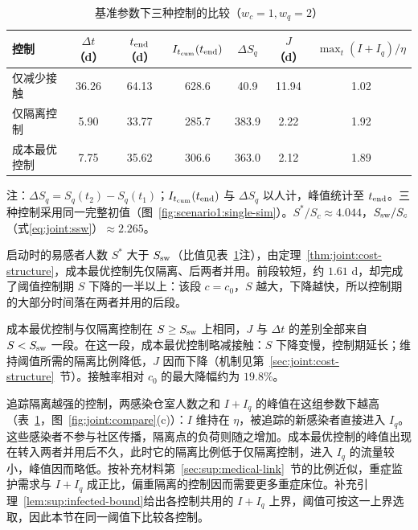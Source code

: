 \begingroup
\begin{table}[!htbp]
\centering\small
\setlength{\tabcolsep}{3pt}
\renewcommand{\arraystretch}{1.25}
\begin{threeparttable}
\caption{基准参数下三种控制的比较（$w_c=1,w_q=2$）}
\label{tab:joint:compare}
\begin{tabular*}{\linewidth}{@{\extracolsep{\fill}}lcccccc@{}}
\toprule
控制 & $\Delta t$（d） & $t_{\rm end}$（d） & $I_{t_{\mathrm{cum}}}(t_{\rm end})$ & $\Delta S_q$ & $J$（d） & $\max_t(I+I_q)/\eta$\\
\midrule
仅减少接触 & 36.26 & 64.13 & 628.6 & 40.9 & 11.94 & 1.02\\
仅隔离控制 & 5.90 & 33.77 & 285.7 & 383.9 & 2.22 & 1.92\\
成本最优控制 & 7.75 & 35.62 & 306.6 & 363.0 & 2.12 & 1.89\\
\bottomrule
\end{tabular*}
\begin{tablenotes}[flushleft]\footnotesize
\item 注：$\Delta S_q=S_q(t_2)-S_q(t_1)$；$I_{t_{\mathrm{cum}}}(t_{\rm end})$ 与 $\Delta S_q$ 以人计，峰值统计至 $t_{\rm end}$。三种控制采用同一完整初值（图~\ref{fig:scenario1:single-sim}）。$S^*/S_c\approx 4.044$，$S_{\rm sw}/S_c$（式\eqref{eq:joint:ssw}）$\approx 2.265$。
\end{tablenotes}
\end{threeparttable}
\end{table}
\endgroup

启动时的易感者人数 $S^*$ 大于 $S_{\rm sw}$（比值见表~\ref{tab:joint:compare}注），由定理~\ref{thm:joint:cost-structure}，成本最优控制先仅隔离、后两者并用。前段较短，约 $1.61$ d，却完成了阈值控制期 $S$ 下降的一半以上：该段 $c=c_0$，$S$ 越大，下降越快，所以控制期的大部分时间落在两者并用的后段。

成本最优控制与仅隔离控制在 $S\ge S_{\rm sw}$ 上相同，$J$ 与 $\Delta t$ 的差别全部来自 $S<S_{\rm sw}$ 一段。在这一段，成本最优控制略减接触：$S$ 下降变慢，控制期延长；维持阈值所需的隔离比例降低，$J$ 因而下降（机制见第~\ref{sec:joint:cost-structure}~节）。接触率相对 $c_0$ 的最大降幅约为 $19.8\%$。

追踪隔离越强的控制，两感染仓室人数之和 $I+I_q$ 的峰值在这组参数下越高（表~\ref{tab:joint:compare}，图~\ref{fig:joint:compare}(c)）：$I$ 维持在 $\eta$，被追踪的新感染者直接进入 $I_q$。这些感染者不参与社区传播，隔离点的负荷则随之增加。成本最优控制的峰值出现在转入两者并用后不久，此时它的隔离比例低于仅隔离控制，进入 $I_q$ 的流量较小，峰值因而略低。按补充材料第~\ref{sec:sup:medical-link}~节的比例近似，重症监护需求与 $I+I_q$ 成正比，偏重隔离的控制因而需要更多重症床位。补充引理~\ref*{lem:sup:infected-bound}给出各控制共用的 $I+I_q$ 上界，阈值可按这一上界选取，因此本节在同一阈值下比较各控制。

